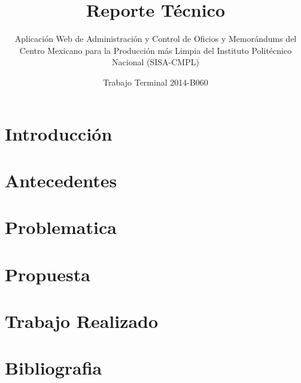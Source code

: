 \documentclass[oneside,10pt]{book}
\title{Reporte Técnico}
\subtitle{Aplicación Web de Administración y Control de Oficios y Memorándums del Centro Mexicano para la Producción más Limpia del Instituto Politécnico Nacional (SISA-CMPL)}
\author{Trabajo Terminal 2014-B060}
\begin{document}
\maketitle
\thispagestyle{empty}

\frontmatter
\tableofcontents

\mainmatter

\chapter{Introducción}


\chapter{Antecedentes}


\chapter{Problematica}

\chapter{Propuesta}

\chapter{Trabajo Realizado}



\chapter{Bibliografia}

\end{document}

